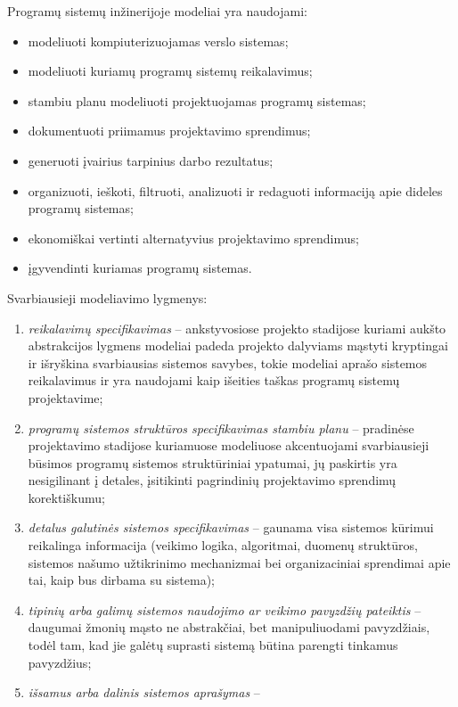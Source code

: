 Programų sistemų inžinerijoje modeliai yra naudojami:
\begin{itemize}
  \item modeliuoti kompiuterizuojamas verslo sistemas;
  \item modeliuoti kuriamų programų sistemų reikalavimus;
  \item stambiu planu modeliuoti projektuojamas programų sistemas;
  \item dokumentuoti priimamus projektavimo sprendimus;
  \item generuoti įvairius tarpinius darbo rezultatus;
  \item organizuoti, ieškoti, filtruoti, analizuoti ir redaguoti 
    informaciją apie dideles programų sistemas;
  \item ekonomiškai vertinti alternatyvius projektavimo sprendimus;
  \item įgyvendinti kuriamas programų sistemas.
\end{itemize}

Svarbiausieji modeliavimo lygmenys:
\begin{enumerate}
  \item \emph{reikalavimų specifikavimas} – ankstyvosiose projekto 
    stadijose kuriami aukšto abstrakcijos lygmens modeliai padeda
    projekto dalyviams mąstyti kryptingai ir išryškina svarbiausias
    sistemos savybes, tokie modeliai aprašo sistemos reikalavimus ir
    yra naudojami kaip išeities taškas programų sistemų projektavime;
  \item \emph{programų sistemos struktūros specifikavimas stambiu planu}
    – pradinėse projektavimo stadijose kuriamuose modeliuose akcentuojami
    svarbiausieji būsimos programų sistemos struktūriniai ypatumai, jų
    paskirtis yra nesigilinant į detales, įsitikinti pagrindinių
    projektavimo sprendimų korektiškumu;
  \item \emph{detalus galutinės sistemos specifikavimas} – gaunama
    visa sistemos kūrimui reikalinga informacija (veikimo logika,
    algoritmai, duomenų struktūros, sistemos našumo užtikrinimo
    mechanizmai bei organizaciniai sprendimai apie tai, kaip bus
    dirbama su sistema);
  \item \emph{tipinių arba galimų sistemos naudojimo ar veikimo pavyzdžių
    pateiktis} – daugumai žmonių mąsto ne abstrakčiai, bet manipuliuodami
    pavyzdžiais, todėl tam, kad jie galėtų suprasti sistemą būtina
    parengti tinkamus pavyzdžius;
  \item \emph{išsamus arba dalinis sistemos aprašymas} – 
\end{enumerate}

